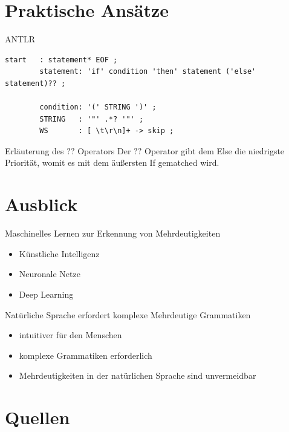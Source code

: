 \documentclass[t]{beamer}
\begin{document}
    \section{Praktische Ansätze}\label{sec:praktische-ansatze}
    \begin{frame}[fragile]
        \begin{block}{ANTLR}
	        \hspace*{-3.5em}
            \begin{minipage}{\textwidth+3.5em}
                \begin{lstlisting}[style=antlr,label={lst:lstlisting3}]
        start   : statement* EOF ;
        statement: 'if' condition 'then' statement ('else' statement)?? ;

        condition: '(' STRING ')' ;
        STRING   : '"' .*? '"' ;
        WS       : [ \t\r\n]+ -> skip ;
                \end{lstlisting}
            \end{minipage}
        \end{block}
        \vspace{1em}
        \begin{exampleblock}{Erläuterung des \(??\) Operators}
            Der \(??\) Operator gibt dem Else die niedrigste Priorität, womit es mit dem äußersten If gematched wird.
        \end{exampleblock}\cite{parr}
    \end{frame}


    \section{Ausblick}\label{sec:ausblick-und-zukunftige-projekte}
    \begin{frame}
		\begin{block}{Maschinelles Lernen zur Erkennung von Mehrdeutigkeiten}
			\begin{itemize}
				\item Künstliche Intelligenz
				\item Neuronale Netze
				\item Deep Learning
			\end{itemize}
		\end{block}
		\begin{block}{Natürliche Sprache erfordert komplexe Mehrdeutige Grammatiken}
			\begin{itemize}
				\item intuitiver für den Menschen
				\item komplexe Grammatiken erforderlich
				\item Mehrdeutigkeiten in der natürlichen Sprache sind unvermeidbar
			\end{itemize}
		\end{block}
    \end{frame}


    \section{Quellen}\label{sec:quellen}
    \begin{frame}[allowframebreaks]
        
        
    \end{frame}
\end{document}
